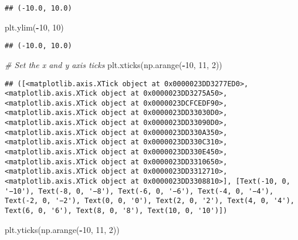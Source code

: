 \documentclass[
]{article}
\newenvironment{Shaded}{\begin{snugshade}}{\end{snugshade}}
\newcommand{\CommentTok}[1]{\textcolor[rgb]{0.56,0.35,0.01}{\textit{#1}}}
\newcommand{\DecValTok}[1]{\textcolor[rgb]{0.00,0.00,0.81}{#1}}
\newcommand{\NormalTok}[1]{#1}
\newcommand{\OperatorTok}[1]{\textcolor[rgb]{0.81,0.36,0.00}{\textbf{#1}}}
\begin{document}
\begin{verbatim}
## (-10.0, 10.0)
\end{verbatim}

\begin{Shaded}
\begin{Highlighting}[]
\NormalTok{plt.ylim(}\OperatorTok{{-}}\DecValTok{10}\NormalTok{, }\DecValTok{10}\NormalTok{)}
\end{Highlighting}
\end{Shaded}

\begin{verbatim}
## (-10.0, 10.0)
\end{verbatim}

\begin{Shaded}
\begin{Highlighting}[]
\CommentTok{\# Set the x and y axis ticks}
\NormalTok{plt.xticks(np.arange(}\OperatorTok{{-}}\DecValTok{10}\NormalTok{, }\DecValTok{11}\NormalTok{, }\DecValTok{2}\NormalTok{))}
\end{Highlighting}
\end{Shaded}

\begin{verbatim}
## ([<matplotlib.axis.XTick object at 0x0000023DD3277ED0>, <matplotlib.axis.XTick object at 0x0000023DD3275A50>, <matplotlib.axis.XTick object at 0x0000023DCFCEDF90>, <matplotlib.axis.XTick object at 0x0000023DD33030D0>, <matplotlib.axis.XTick object at 0x0000023DD33090D0>, <matplotlib.axis.XTick object at 0x0000023DD330A350>, <matplotlib.axis.XTick object at 0x0000023DD330C310>, <matplotlib.axis.XTick object at 0x0000023DD330E450>, <matplotlib.axis.XTick object at 0x0000023DD3310650>, <matplotlib.axis.XTick object at 0x0000023DD3312710>, <matplotlib.axis.XTick object at 0x0000023DD3308810>], [Text(-10, 0, '−10'), Text(-8, 0, '−8'), Text(-6, 0, '−6'), Text(-4, 0, '−4'), Text(-2, 0, '−2'), Text(0, 0, '0'), Text(2, 0, '2'), Text(4, 0, '4'), Text(6, 0, '6'), Text(8, 0, '8'), Text(10, 0, '10')])
\end{verbatim}

\begin{Shaded}
\begin{Highlighting}[]
\NormalTok{plt.yticks(np.arange(}\OperatorTok{{-}}\DecValTok{10}\NormalTok{, }\DecValTok{11}\NormalTok{, }\DecValTok{2}\NormalTok{))}
\end{Highlighting}
\end{Shaded}
\end{document}
